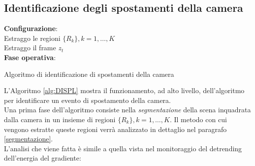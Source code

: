 \subsection{Identificazione degli spostamenti della camera}
\label{monitoraggioDISPL}
\begin{algorithm}[tp]
	\LinesNumbered
	\textbf{Configurazione}:\\
	 Estraggo le regioni $\{R_k\}, k=1,\dots,K$  \\
	 
	{	 Estraggo il frame $z_t$ \\
		 
	}
	 
	\textbf{Fase operativa}:\\
	    
	\caption{Algoritmo di identificazione di spostamenti della camera}
	\label{alg:DISPL}
\end{algorithm}
L'Algoritmo \ref{alg:DISPL} mostra il funzionamento, ad alto livello, dell'algoritmo per identificare un evento di spostamento della camera.\\
Una prima fase dell'algoritmo consiste nella \textit{segmentazione} della scena inquadrata dalla camera in un insieme di regioni $\{R_k\}, k=1,\dots,K$.
Il metodo con cui vengono estratte queste regioni verr\`a analizzato in dettaglio nel paragrafo \ref{segmentazione}. \\
L'analisi che viene fatta \`e simile a quella vista nel monitoraggio del detrending dell'energia del gradiente:
